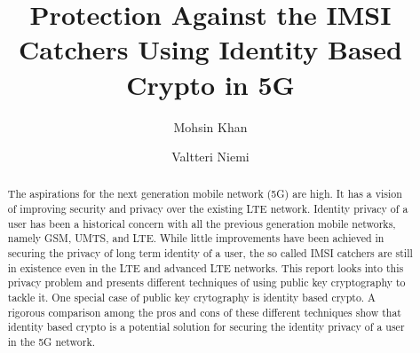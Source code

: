 \documentclass[lnicst,sechang,a4paper]{svmultln}
\begin{document}
\mainmatter  %

\title{Protection Against the IMSI Catchers Using Identity Based Crypto in 5G}


%
%
\author{Mohsin Khan%
\and Valtteri Niemi}  %


%
%

\maketitle


\begin{abstract}
The aspirations for the next generation mobile network (5G) are high. It has a vision of improving security and privacy over the existing LTE network. Identity privacy of a user has been a historical concern with all the previous generation mobile networks, namely GSM, UMTS, and LTE. While little improvements have been achieved in securing the privacy of long term identity of a user, the so called IMSI catchers are still in existence even in the LTE and advanced LTE networks. This report looks into this privacy problem and presents different techniques of using public key cryptography to tackle it. One special case of public key crytography is identity based crypto. A rigorous comparison among the pros and cons of these different techniques show that identity based crypto is a potential solution for securing the identity privacy of a user in the 5G network.
\end{abstract}
\end{document}
